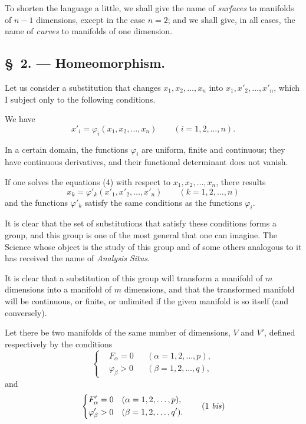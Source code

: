 \documentclass{article}
\begin{document}
To shorten the language a little, we shall give the name of \emph{surfaces} to manifolds of $n - 1$ dimensions, except in the case $n = 2$; and we shall give, in all cases, the name of \emph{curves} to manifolds of one dimension.

\subsection*{\S~2. --- Homeomorphism.}

Let us consider a substitution that changes $x_{1}, x_{2}, \ldots, x_{n}$ into $x_{1}, x'_{2}, \ldots, x'_{n}$, which I subject only to the following conditions.

We have
\[
x'_{i} = \varphi_{i}(x_{1}, x_{2}, \ldots, x_{n}) \qquad (i = 1, 2, \ldots, n).
\tag{4}
\]

In a certain domain, the functions $\varphi_{i}$ are uniform, finite and continuous; they have continuous derivatives, and their functional determinant does not vanish.

If one solves the equations (4) with respect to $x_{1}, x_{2}, \ldots, x_{n}$, there results
\[
x_{k} = \varphi'_{k}(x'_{1}, x'_{2}, \ldots, x'_{n}) \qquad (k = 1, 2, \ldots, n)
\]
and the functions $\varphi'_{k}$ satisfy the same conditions as the functions $\varphi_{i}$.

It is clear that the set of substitutions that satisfy these conditions forms a group, and this group is one of the most general that one can imagine. The Science whose object is the study of this group and of some others analogous to it has received the name of \emph{Analysis Situs}.

It is clear that a substitution of this group will transform a manifold of $m$ dimensions into a manifold of $m$ dimensions, and that the transformed manifold will be continuous, or finite, or unlimited if the given manifold is so itself (and conversely).

Let there be two manifolds of the same number of dimensions, $V$ and $V'$, defined respectively by the conditions
\[
\left\{
\begin{aligned}
&F_{\alpha} = 0 &&(\alpha = 1, 2, \ldots, p),\\
&\varphi_{\beta} > 0 &&(\beta = 1, 2, \ldots, q),
\end{aligned}
\right.
\tag{1}
\]
and
\[
\left\{
\begin{aligned}
&F'_{\alpha} = 0 &&(\alpha = 1, 2, \ldots, p),\\
&\varphi'_{\beta} > 0 &&(\beta = 1, 2, \ldots, q').
\end{aligned}
\right.
\tag{1 \textit{bis}}
\]
\end{document}
